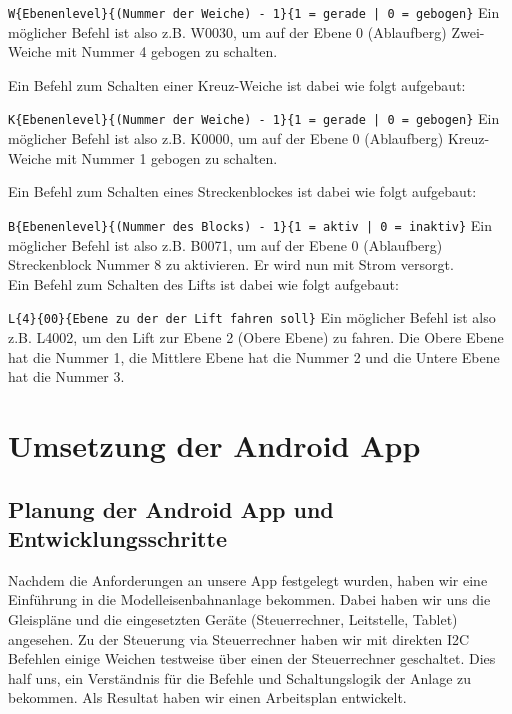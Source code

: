 \documentclass{article}
\begin{document}
\texttt{W\{Ebenenlevel\}\{(Nummer der Weiche) - 1\}\{1 = gerade | 0 = gebogen\}}
Ein möglicher Befehl ist also z.B. W0030, um auf der Ebene 0 (Ablaufberg) Zwei-Weiche mit Nummer 4 gebogen zu schalten.

Ein Befehl zum Schalten einer Kreuz-Weiche ist dabei wie folgt aufgebaut:

\texttt{K\{Ebenenlevel\}\{(Nummer der Weiche) - 1\}\{1 = gerade | 0 = gebogen\}}
Ein möglicher Befehl ist also z.B. K0000, um auf der Ebene 0 (Ablaufberg) Kreuz-Weiche mit Nummer 1 gebogen zu schalten.

Ein Befehl zum Schalten eines Streckenblockes ist dabei wie folgt aufgebaut:

\texttt{B\{Ebenenlevel\}\{(Nummer des Blocks) - 1\}\{1 = aktiv | 0 = inaktiv\}}
Ein möglicher Befehl ist also z.B. B0071, um auf der Ebene 0 (Ablaufberg) Streckenblock Nummer 8 zu aktivieren.
Er wird nun mit Strom versorgt.
\\
Ein Befehl zum Schalten des Lifts ist dabei wie folgt aufgebaut:

\texttt{L\{4\}\{00\}\{Ebene zu der der Lift fahren soll\}}
Ein möglicher Befehl ist also z.B. L4002, um den Lift zur Ebene 2 (Obere Ebene) zu fahren.
Die Obere Ebene hat die Nummer 1, die Mittlere Ebene hat die Nummer 2 und die Untere Ebene hat die Nummer 3.

\section{Umsetzung der Android App}

\subsection{Planung der Android App und Entwicklungsschritte}
Nachdem die Anforderungen an unsere App festgelegt wurden, haben wir eine Einführung in die Modelleisenbahnanlage bekommen.
Dabei haben wir uns die Gleispläne und die eingesetzten Geräte (Steuerrechner, Leitstelle, Tablet) angesehen.
Zu der Steuerung via Steuerrechner haben wir mit direkten I2C Befehlen einige Weichen testweise über einen der Steuerrechner geschaltet.
Dies half uns, ein Verständnis für die Befehle und Schaltungslogik der Anlage zu bekommen.
Als Resultat haben wir einen Arbeitsplan entwickelt.
\end{document}
